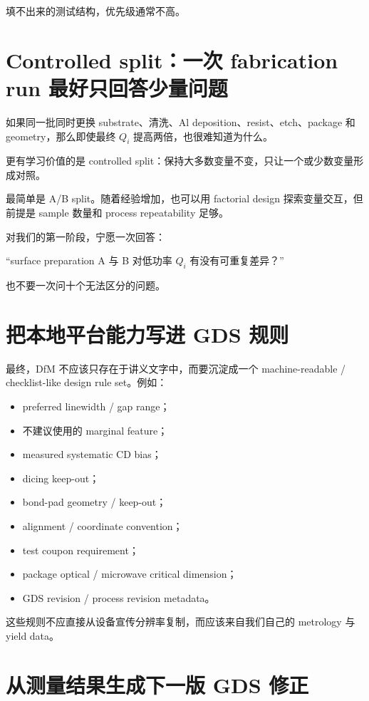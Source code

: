 填不出来的测试结构，优先级通常不高。

\section{Controlled split：一次 fabrication run 最好只回答少量问题}

如果同一批同时更换 substrate、清洗、Al deposition、resist、etch、package 和 geometry，那么即使最终 $Q_i$ 提高两倍，也很难知道为什么。

更有学习价值的是 controlled split：保持大多数变量不变，只让一个或少数变量形成对照。

最简单是 A/B split。随着经验增加，也可以用 factorial design 探索变量交互，但前提是 sample 数量和 process repeatability 足够。

对我们的第一阶段，宁愿一次回答：

\begin{center}
“surface preparation A 与 B 对低功率 $Q_i$ 有没有可重复差异？”
\end{center}

也不要一次问十个无法区分的问题。

\section{把本地平台能力写进 GDS 规则}

最终，DfM 不应该只存在于讲义文字中，而要沉淀成一个 machine-readable / checklist-like design rule set。例如：

\begin{itemize}
  \item preferred linewidth / gap range；
  \item 不建议使用的 marginal feature；
  \item measured systematic CD bias；
  \item dicing keep-out；
  \item bond-pad geometry / keep-out；
  \item alignment / coordinate convention；
  \item test coupon requirement；
  \item package optical / microwave critical dimension；
  \item GDS revision / process revision metadata。
\end{itemize}

这些规则不应直接从设备宣传分辨率复制，而应该来自我们自己的 metrology 与 yield data。

\section{从测量结果生成下一版 GDS 修正}

